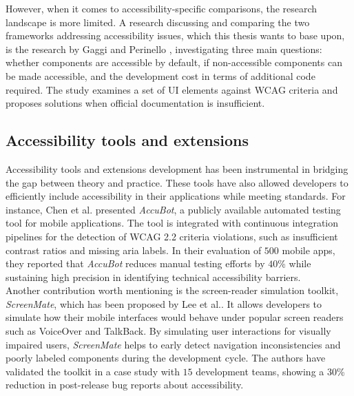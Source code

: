 However, when it comes to accessibility-specific comparisons, the research landscape is more limited. 
A research discussing and comparing the two frameworks addressing accessibility issues, which this thesis wants to base upon, is the research by Gaggi and Perinello \cite{perinello2024accessibility}, investigating three main questions: whether components are accessible by default, if non-accessible components can be made accessible, and the development cost in terms of additional code required. The study examines a set of UI elements against WCAG criteria and proposes solutions when official documentation is insufficient. \\

\subsection{Accessibility tools and extensions}

Accessibility tools and extensions development has been instrumental in bridging the gap between theory and practice. These tools have also allowed developers to efficiently include accessibility in their applications while meeting standards. For instance, Chen et al. \cite{chen2023automated} presented \textit{AccuBot}, a publicly available automated testing tool for mobile applications. The tool is integrated with continuous integration pipelines for the detection of WCAG 2.2 criteria violations, such as insufficient contrast ratios and missing \acrshort{aria} labels. In their evaluation of $500$ mobile apps, they reported that \textit{AccuBot} reduces manual testing efforts by $40$\% while sustaining high precision in identifying technical accessibility barriers.\\

Another contribution worth mentioning is the screen-reader simulation toolkit, \textit{ScreenMate}, which has been proposed by Lee et al.\cite{lee2021screenmate}. It allows developers to simulate how their mobile interfaces would behave under popular screen readers such as VoiceOver and TalkBack. By simulating user interactions for visually impaired users, \textit{ScreenMate} helps to early detect navigation inconsistencies and poorly labeled components during the development cycle. The authors have validated the toolkit in a case study with $15$ development teams, showing a $30$\% reduction in post-release bug reports about accessibility.\\

